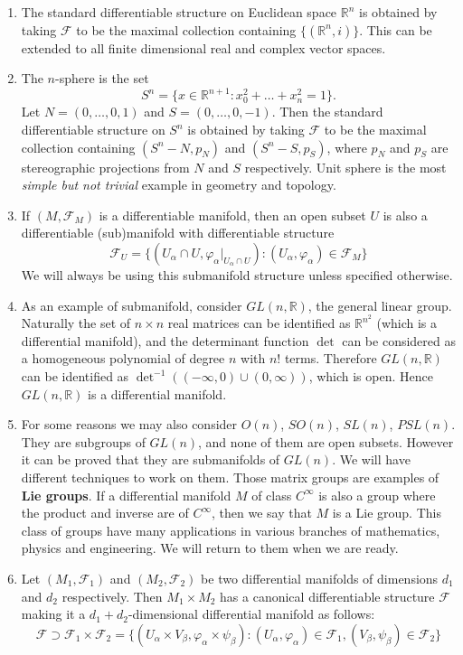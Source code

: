 \documentclass[twoside]{article}
\begin{document}
		\begin{enumerate}
			\item The standard differentiable structure on Euclidean space $\mathbb{R}^n$ is obtained by taking $\mathscr{F}$ to be the maximal collection containing $\{(\mathbb{R}^n,i)\}$. This can be extended to all finite dimensional real and complex vector spaces.
			\item The $n$-sphere is the set
			\[
				S^n = \{x \in \mathbb{R}^{n+1}:x_0^2+\dots+x_n^2=1\}.
			\]
			Let $N=(0,\dots,0,1)$ and $S = (0,\dots,0,-1)$. Then the standard differentiable structure on $S^n$ is obtained by taking $\mathscr{F}$ to be the maximal collection containing $(S^n-N,p_N)$ and $(S^n-S,p_S)$, where $p_N$ and $p_S$ are stereographic projections from $N$ and $S$ respectively. Unit sphere is the most \textit{simple but not trivial} example in geometry and topology. 
			\item If $(M,\mathscr{F}_M)$ is a differentiable manifold, then an open subset $U$ is also a differentiable (sub)manifold with differentiable structure
			\[
				\mathscr{F}_U = \{(U_\alpha \cap U, \varphi_\alpha|_{U_\alpha \cap U}):(U_\alpha,\varphi_\alpha) \in \mathscr{F}_M\}
			\]
			We will always be using this submanifold structure unless specified otherwise. 
			\item As an example of submanifold, consider $GL(n,\mathbb{R})$, the general linear group. Naturally the set of $n \times n$ real matrices can be identified as $\mathbb{R}^{n^2}$ (which is a differential manifold), and the determinant function $\det$ can be considered as a homogeneous polynomial of degree $n$ with $n!$ terms. Therefore $GL(n,\mathbb{R})$ can be identified as $\det^{-1}((-\infty,0) \cup (0,\infty))$, which is open. Hence $GL(n,\mathbb{R})$ is a differential manifold. 
			\item For some reasons we may also consider $O(n)$, $SO(n)$, $SL(n)$, $PSL(n)$. They are subgroups of $GL(n)$, and none of them are open subsets. However it can be proved that they are submanifolds of $GL(n)$. We will have different techniques to work on them. Those matrix groups are examples of \textbf{Lie groups}. If a differential manifold $M$ of class $C^\infty$ is also a group where the product and inverse are of $C^\infty$, then we say that $M$ is a Lie group. This class of groups have many applications in various branches of mathematics, physics and engineering. We will return to them when we are ready.
			\item Let $(M_1,\mathscr{F}_1)$ and $(M_2,\mathscr{F}_2)$ be two differential manifolds of dimensions $d_1$ and $d_2$ respectively. Then $M_1 \times M_2$ has a canonical differentiable structure $\mathscr{F}$ making it a $d_1+d_2$-dimensional differential manifold as follows:
			\[
				\mathscr{F} \supset \mathscr{F}_1 \times \mathscr{F}_2 = \{(U_\alpha \times V_\beta,\varphi_\alpha \times \psi_\beta):(U_\alpha,\varphi_\alpha)\in \mathscr{F}_1,(V_\beta,\psi_\beta) \in \mathscr{F}_2\}
			\]
		\end{enumerate}
\end{document}
